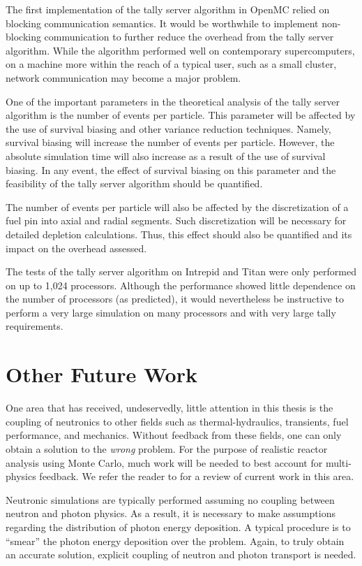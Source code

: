 The first implementation of the tally server algorithm in OpenMC relied on
blocking communication semantics. It would be worthwhile to implement
non-blocking communication to further reduce the overhead from the tally server
algorithm. While the algorithm performed well on contemporary supercomputers, on
a machine more within the reach of a typical user, such as a small cluster,
network communication may become a major problem.

One of the important parameters in the theoretical analysis of the tally server
algorithm is the number of events per particle. This parameter will be affected
by the use of survival biasing and other variance reduction techniques. Namely,
survival biasing will increase the number of events per particle. However, the
absolute simulation time will also increase as a result of the use of survival
biasing. In any event, the effect of survival biasing on this parameter and the
feasibility of the tally server algorithm should be quantified.

The number of events per particle will also be affected by the discretization of
a fuel pin into axial and radial segments. Such discretization will be necessary
for detailed depletion calculations. Thus, this effect should also be quantified
and its impact on the overhead assessed.

The tests of the tally server algorithm on Intrepid and Titan were only
performed on up to 1,024 processors. Although the performance showed little
dependence on the number of processors (as predicted), it would nevertheless be
instructive to perform a very large simulation on many processors and with very
large tally requirements.

\section{Other Future Work}

One area that has received, undeservedly, little attention in this thesis is the
coupling of neutronics to other fields such as thermal-hydraulics, transients,
fuel performance, and mechanics. Without feedback from these fields, one can
only obtain a solution to the \emph{wrong} problem. For the purpose of realistic
reactor analysis using Monte Carlo, much work will be needed to best account for
multi-physics feedback. We refer the reader to \cite{net-martin-2012} for a
review of current work in this area.

Neutronic simulations are typically performed assuming no coupling between
neutron and photon physics. As a result, it is necessary to make assumptions
regarding the distribution of photon energy deposition. A typical procedure is
to ``smear'' the photon energy deposition over the problem. Again, to truly
obtain an accurate solution, explicit coupling of neutron and photon transport
is needed.

